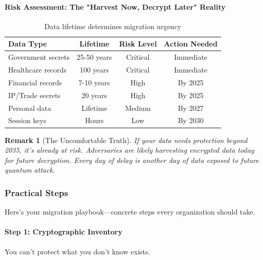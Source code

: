 \documentclass[11pt,a4paper]{article}
\newtheorem{remark}{Remark}
\begin{document}
\paragraph{Risk Assessment: The "Harvest Now, Decrypt Later" Reality}

\begin{table}[h]
\centering
\begin{tabular}{|l|c|c|c|}
\hline
\textbf{Data Type} & \textbf{Lifetime} & \textbf{Risk Level} & \textbf{Action Needed} \\
\hline
Government secrets & 25-50 years & Critical & Immediate \\
Healthcare records & 100 years & Critical & Immediate \\
Financial records & 7-10 years & High & By 2025 \\
IP/Trade secrets & 20 years & High & By 2025 \\
Personal data & Lifetime & Medium & By 2027 \\
Session keys & Hours & Low & By 2030 \\
\hline
\end{tabular}
\caption{Data lifetime determines migration urgency}
\end{table}

\begin{remark}[The Uncomfortable Truth]
If your data needs protection beyond 2035, it's already at risk. Adversaries are likely harvesting encrypted data today for future decryption. Every day of delay is another day of data exposed to future quantum attack.
\end{remark}

\subsubsection{Practical Steps}

Here's your migration playbook—concrete steps every organization should take.

\paragraph{Step 1: Cryptographic Inventory}

You can't protect what you don't know exists.
\end{document}
